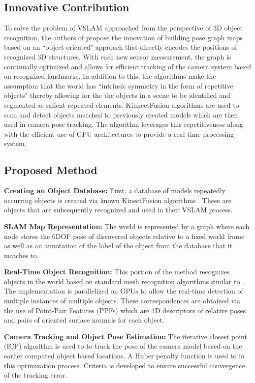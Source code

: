 \documentclass[10pt,twocolumn,letterpaper]{article}
\begin{document}
\subsection{Innovative Contribution}
To solve the problem of VSLAM approached from the perspective of 3D object recognition, the authors of \cite{Salas-Moreno_2013_CVPR} propose the innovation of building pose graph maps based on an ``object-oriented" approach that directly encodes the positions of recognized 3D structures. With each new sensor measurement, the graph is continually optimized and allows for efficient tracking of the camera system based on recognized landmarks. In addition to this, the algorithms make the assumption that the world has ``intrinsic symmetry in the form of repetitive objects" thereby allowing for the the objects in a scene to be identified and segmented as salient repeated elements. KinnectFusion algorithms are used to scan and detect objects matched to previously created models which are then used in camera pose tracking. The algorithm leverages this repetitiveness along with the efficient use of GPU architectures to provide a real time processing system. 

\subsection{Proposed Method}
\textbf{Creating an Object Database:} First, a database of models repeatedly occurring objects is created via known KinectFusion algorithms \cite{kf11}. These are objects that are subsequently recognized and used in their VSLAM process. 

\textbf{SLAM Map Representation:} The world is represented by a graph where each node stores the 6DOF 
pose of discovered objects relative to a fixed world frame as well as an annotation of the label of the object from the database that it matches to.

\textbf{Real-Time Object Recognition:} This portion of the method recognizes objects in the world based on standard mesh recognition algorithms similar to \cite{drost6}. The implementation is parallelized on GPUs to allow the real-time detection of multiple instances of multiple objects. These correspondences are obtained via the use of Point-Pair Features (PPFs) which are 4D descriptors of relative poses and pairs of oriented surface normals for each object. 

\textbf{Camera Tracking and Object Pose Estimation:} The iterative closest point (ICP) algorithm \cite{icp15} is used to to track the pose of the camera model based on the earlier computed object based locations. A Huber penalty function is used to in this optimization process. Criteria is developed to ensure successful convergence of the tracking error.
\end{document}
